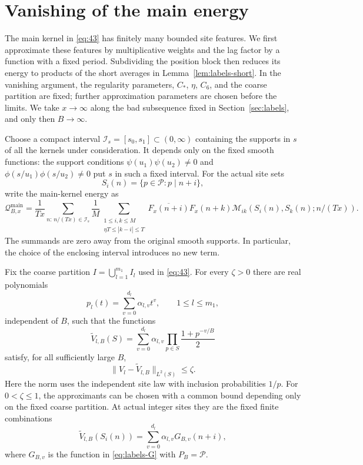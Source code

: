 \section{Vanishing of the main energy}
\label{sec:conclusion}

The main kernel in \eqref{eq:43} has finitely many bounded site features.
We first approximate these features by multiplicative weights and the lag
factor by a function with a fixed period.  Subdividing the position block
then reduces its energy to products of the short averages in
Lemma~\ref{lem:labels-short}.  In the vanishing argument, the regularity
parameters, $C_*$, $\eta$, $C_6$, and the coarse partition are fixed;
further approximation parameters are chosen before the limits.  We take
$x\to\infty$ along the bad subsequence fixed in Section~\ref{sec:labels},
and only then $B\to\infty$.

Choose a compact interval $\mathcal I_s=[s_0,s_1]\subset(0,\infty)$
containing the supports in $s$ of all the kernels under consideration.
It depends only on the fixed smooth functions: the support conditions
$\psi(u_1)\psi(u_2)\ne0$ and
$\phi(s/u_1)\phi(s/u_2)\ne0$ put $s$ in such a fixed interval.
For the actual site sets
\[
 S_i(n)=\{p\in\mathcal P:p\mid n+i\},
\]
write the main-kernel energy as
\begin{equation}
 \mathcal Q^{\mathrm{main}}_{B,x}
 =\frac1{Tx}\sum_{n:\,n/(Tx)\in\mathcal I_s}\frac1M
   \sum_{\substack{1\le i,k\le M\\\eta T\le |k-i|\le T}}
       \overline{F_x(n+i)}F_x(n+k)
       \mathcal M_{ik}(S_i(n),S_k(n);n/(Tx)).
 \label{eq:conclusion-main-energy}
\end{equation}
The summands are zero away from the original smooth supports.  In
particular, the choice of the enclosing interval introduces no new term.

\begin{lemma}
\label{lem:conclusion-features}
Fix the coarse partition $I=\bigcup_{l=1}^{m_1}I_l$ used in
\eqref{eq:43}.  For every $\zeta>0$ there are real polynomials
\[
 p_l(t)=\sum_{v=0}^{d_l}\alpha_{l,v}t^v,
 \qquad 1\le l\le m_1,
\]
independent of $B$, such that the functions
\[
 \widetilde V_{l,B}(S)
   =\sum_{v=0}^{d_l}\alpha_{l,v}
       \prod_{p\in S}\frac{1+p^{-v/B}}2
\]
satisfy, for all sufficiently large $B$,
\[
 \|V_l-\widetilde V_{l,B}\|_{L^2(S)}\le\zeta.
\]
Here the norm uses the independent site law with inclusion probabilities
$1/p$.  For $0<\zeta\le1$, the approximants can be chosen with a common
bound depending only on the fixed coarse partition.  At actual integer
sites they are the fixed finite combinations
\[
 \widetilde V_{l,B}(S_i(n))
       =\sum_{v=0}^{d_l}\alpha_{l,v}G_{B,v}(n+i),
\]
where $G_{B,v}$ is the function in \eqref{eq:labels-G} with
$P_B=\mathcal P$.
\end{lemma}

